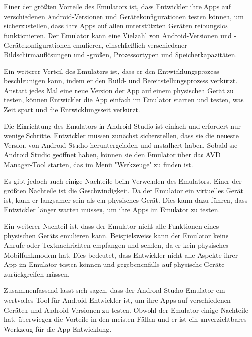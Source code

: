 Einer der größten Vorteile des Emulators ist, dass Entwickler ihre Apps auf verschiedenen Android-Versionen und Gerätekonfigurationen testen können, um sicherzustellen, 
dass ihre Apps auf allen unterstützten Geräten reibungslos funktionieren. 
Der Emulator kann eine Vielzahl von Android-Versionen und -Gerätekonfigurationen emulieren, einschließlich verschiedener Bildschirmauflösungen und -größen, 
Prozessortypen und Speicherkapazitäten.

Ein weiterer Vorteil des Emulators ist, dass er den Entwicklungsprozess beschleunigen kann, indem er den Build- und Bereitstellungsprozess verkürzt. 
Anstatt jedes Mal eine neue Version der App auf einem physischen Gerät zu testen, können Entwickler die App einfach im Emulator starten und testen, 
was Zeit spart und die Entwicklungszeit verkürzt.

Die Einrichtung des Emulators in Android Studio ist einfach und erfordert nur wenige Schritte. Entwickler müssen zunächst sicherstellen, 
dass sie die neueste Version von Android Studio heruntergeladen und installiert haben. Sobald sie Android Studio geöffnet haben, können sie den Emulator über das AVD Manager-Tool starten, 
das im Menü "Werkzeuge" zu finden ist.

Es gibt jedoch auch einige Nachteile beim Verwenden des Emulators. Einer der größten Nachteile ist die Geschwindigkeit. Da der Emulator ein virtuelles Gerät ist, 
kann er langsamer sein als ein physisches Gerät. Dies kann dazu führen, dass Entwickler länger warten müssen, um ihre Apps im Emulator zu testen.

Ein weiterer Nachteil ist, dass der Emulator nicht alle Funktionen eines physischen Geräts emulieren kann. Beispielsweise kann der Emulator keine Anrufe oder Textnachrichten empfangen und senden, 
da er kein physisches Mobilfunkmodem hat. Dies bedeutet, dass Entwickler nicht alle Aspekte ihrer App im Emulator testen können und gegebenenfalls auf physische Geräte zurückgreifen müssen.

Zusammenfassend lässt sich sagen, dass der Android Studio Emulator ein wertvolles Tool für Android-Entwickler ist, um ihre Apps auf verschiedenen Geräten und Android-Versionen zu testen. 
Obwohl der Emulator einige Nachteile hat, überwiegen die Vorteile in den meisten Fällen und er ist ein unverzichtbares Werkzeug für die App-Entwicklung.

